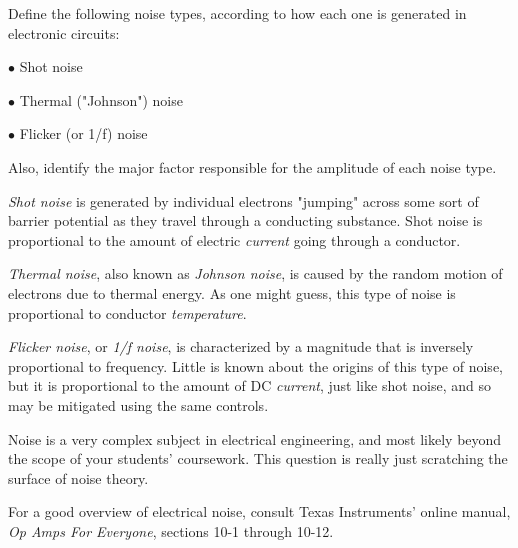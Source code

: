 

Define the following noise types, according to how each one is generated in electronic circuits:

\medskip
\item{$\bullet$} Shot noise
\item{$\bullet$} Thermal ("Johnson") noise
\item{$\bullet$} Flicker (or 1/f) noise
\medskip

Also, identify the major factor responsible for the amplitude of each noise type.







{\it Shot noise} is generated by individual electrons "jumping" across some sort of barrier potential as they travel through a conducting substance.  Shot noise is proportional to the amount of electric {\it current} going through a conductor.

\vskip 10pt

{\it Thermal noise}, also known as {\it Johnson noise}, is caused by the random motion of electrons due to thermal energy.  As one might guess, this type of noise is proportional to conductor {\it temperature}.

\vskip 10pt

{\it Flicker noise}, or {\it 1/f noise}, is characterized by a magnitude that is inversely proportional to frequency.  Little is known about the origins of this type of noise, but it is proportional to the amount of DC {\it current}, just like shot noise, and so may be mitigated using the same controls.







Noise is a very complex subject in electrical engineering, and most likely beyond the scope of your students' coursework.  This question is really just scratching the surface of noise theory. 

For a good overview of electrical noise, consult Texas Instruments' online manual, {\it Op Amps For Everyone}, sections 10-1 through 10-12.




